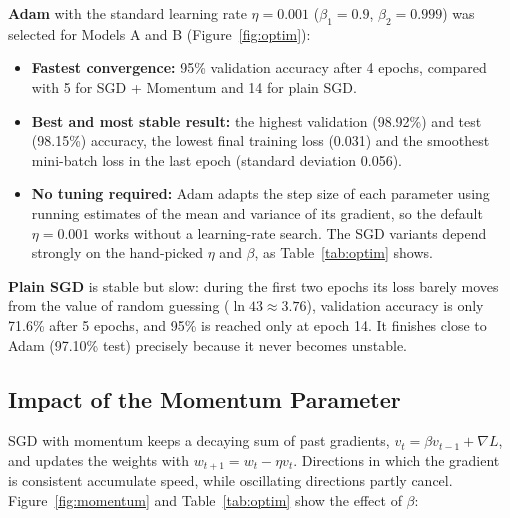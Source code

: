 \documentclass[11pt, a4paper]{article}
\begin{document}
\textbf{Adam} \cite{adam} with the standard learning rate $\eta = 0.001$ ($\beta_1 = 0.9$, $\beta_2 = 0.999$) was
selected for Models A and B (Figure~\ref{fig:optim}):
\begin{itemize}
    \item \textbf{Fastest convergence:} 95\% validation accuracy after 4 epochs, compared with 5 for SGD + Momentum and
          14 for plain SGD.
    \item \textbf{Best and most stable result:} the highest validation (98.92\%) and test (98.15\%) accuracy, the lowest
          final training loss (0.031) and the smoothest mini-batch loss in the last epoch (standard deviation 0.056).
    \item \textbf{No tuning required:} Adam adapts the step size of each parameter using running estimates of the mean
          and variance of its gradient, so the default $\eta = 0.001$ works without a learning-rate search. The SGD
          variants depend strongly on the hand-picked $\eta$ and $\beta$, as Table~\ref{tab:optim} shows.
\end{itemize}

\textbf{Plain SGD} is stable but slow: during the first two epochs its loss barely moves from the value of random
guessing ($\ln 43 \approx 3.76$), validation accuracy is only 71.6\% after 5 epochs, and 95\% is reached only at
epoch 14. It finishes close to Adam (97.10\% test) precisely because it never becomes unstable.

\subsection{Impact of the Momentum Parameter}

SGD with momentum keeps a decaying sum of past gradients, $v_{t} = \beta v_{t-1} + \nabla L$, and updates the weights
with $w_{t+1} = w_t - \eta v_t$. Directions in which the gradient is consistent accumulate speed, while oscillating
directions partly cancel. Figure~\ref{fig:momentum} and Table~\ref{tab:optim} show the effect of $\beta$:
\end{document}
